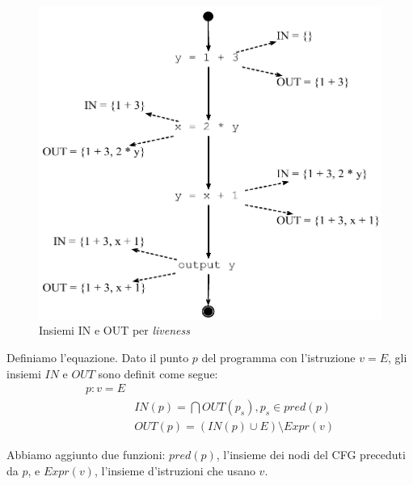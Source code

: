 \begin{figure}[H]
  \centering
  \includegraphics[scale=0.4]{res/image/in_out_available}
  \caption{Insiemi IN e OUT per \textit{liveness}}
  \label{img:in_out_available}
\end{figure}

Definiamo l'equazione. Dato il punto $p$ del programma con l'istruzione $v=E$,
gli insiemi $IN$ e $OUT$ sono definit come segue:
\begin{align*}
p : v = E &                                               \\
          & IN(p) = \bigcap OUT(p_s), p_s \in pred(p)     \\
          & OUT(p) = (IN(p) \cup E) \setminus Expr(v)
\end{align*}

Abbiamo aggiunto due funzioni: $pred(p)$, l'insieme dei nodi del CFG preceduti
da $p$, e $Expr(v)$, l'insieme d'istruzioni che usano $v$.

